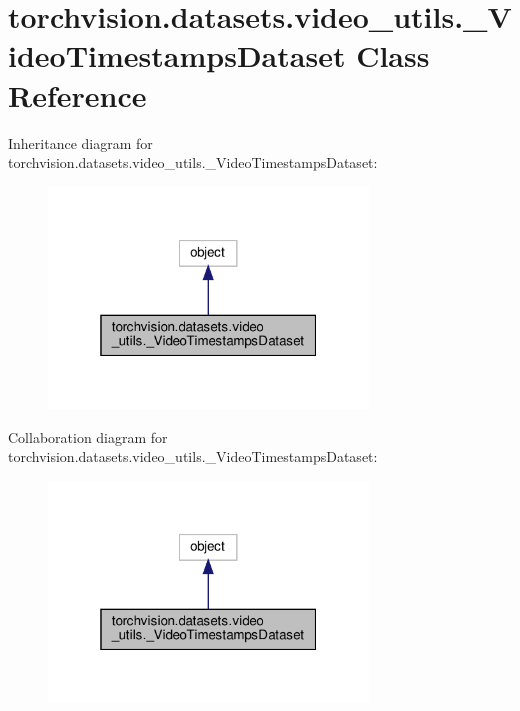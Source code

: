 \hypertarget{classtorchvision_1_1datasets_1_1video__utils_1_1__VideoTimestampsDataset}{}\section{torchvision.\+datasets.\+video\+\_\+utils.\+\_\+\+Video\+Timestamps\+Dataset Class Reference}
\label{classtorchvision_1_1datasets_1_1video__utils_1_1__VideoTimestampsDataset}


Inheritance diagram for torchvision.\+datasets.\+video\+\_\+utils.\+\_\+\+Video\+Timestamps\+Dataset\+:
\nopagebreak
\begin{figure}[H]
\begin{center}
\leavevmode
\includegraphics[width=241pt]{classtorchvision_1_1datasets_1_1video__utils_1_1__VideoTimestampsDataset__inherit__graph}
\end{center}
\end{figure}


Collaboration diagram for torchvision.\+datasets.\+video\+\_\+utils.\+\_\+\+Video\+Timestamps\+Dataset\+:
\nopagebreak
\begin{figure}[H]
\begin{center}
\leavevmode
\includegraphics[width=241pt]{classtorchvision_1_1datasets_1_1video__utils_1_1__VideoTimestampsDataset__coll__graph}
\end{center}
\end{figure}
